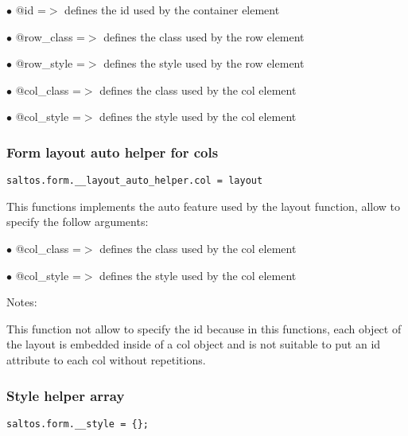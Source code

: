 \documentclass[a4paper]{article}
\begin{document}
\begin{compactitem}
\item[\color{myblue}$\bullet$] @id              =$>$ defines the id used by the container element
\item[\color{myblue}$\bullet$] @row\_class       =$>$ defines the class used by the row element
\item[\color{myblue}$\bullet$] @row\_style       =$>$ defines the style used by the row element
\item[\color{myblue}$\bullet$] @col\_class       =$>$ defines the class used by the col element
\item[\color{myblue}$\bullet$] @col\_style       =$>$ defines the style used by the col element
\end{compactitem}

\hypertarget{toc783}{}
\subsubsection{Form layout auto helper for cols}

\begin{lstlisting}
saltos.form.__layout_auto_helper.col = layout
\end{lstlisting}

This functions implements the auto feature used by the layout function, allow to specify the
follow arguments:

\begin{compactitem}
\item[\color{myblue}$\bullet$] @col\_class       =$>$ defines the class used by the col element
\item[\color{myblue}$\bullet$] @col\_style       =$>$ defines the style used by the col element
\end{compactitem}

Notes:

This function not allow to specify the id because in this functions, each object of the
layout is embedded inside of a col object and is not suitable to put an id attribute
to each col without repetitions.

\hypertarget{toc784}{}
\subsubsection{Style helper array}

\begin{lstlisting}
saltos.form.__style = {};
\end{lstlisting}
\end{document}
